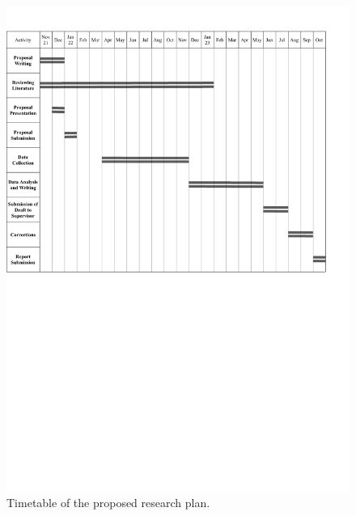 \documentclass[12pt]{article}
\begin{document}
\begin{figure}[h]
\includegraphics[width=\textwidth,keepaspectratio]{Timetable2.pdf}
\caption{Timetable of the proposed research plan.}
\end{figure}
\end{document}
